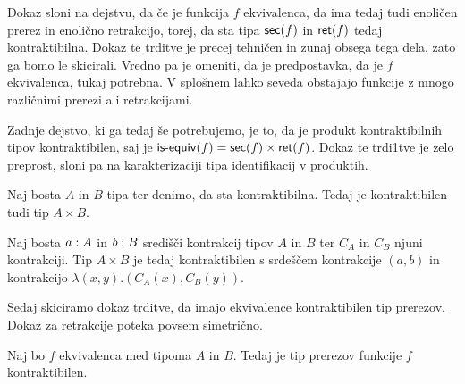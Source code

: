 Dokaz sloni na dejstvu, da če je funkcija \(f\) ekvivalenca, da ima tedaj tudi enoličen prerez in enolično retrakcijo, torej, da sta tipa \(\textnormal{\textsf{sec}}(f)\) in \(\textnormal{\textsf{ret}}(f)\) tedaj kontraktibilna.
Dokaz te trditve je precej tehničen in zunaj obsega tega dela, zato ga bomo le skicirali. Vredno pa je omeniti, da je predpostavka, da je \(f\) ekvivalenca, tukaj potrebna. V splošnem lahko seveda obstajajo funkcije z mnogo različnimi prerezi ali retrakcijami.

Zadnje dejstvo, ki ga tedaj še potrebujemo, je to, da je produkt kontraktibilnih tipov kontraktibilen, saj je \(\textnormal{\textsf{is-equiv}}(f) = \textnormal{\textsf{sec}}(f) \times \textnormal{\textsf{ret}}(f)\). Dokaz te trdi1tve je zelo preprost, sloni pa na karakterizaciji tipa identifikacij v produktih.

\begin{trditev}
  Naj bosta \(A\) in \(B\) tipa ter denimo, da sta kontraktibilna. Tedaj je kontraktibilen tudi tip \(A \times B\).
\end{trditev}

\begin{dokaz}
  Naj bosta \(a : A\) in \(b : B\) središči kontrakcij tipov \(A\) in \(B\) ter \(C_{A}\) in \(C_{B}\) njuni kontrakciji. Tip \(A \times B\) je tedaj kontraktibilen s srdeščem kontrakcije \((a, b)\) in kontrakcijo \(\lambda(x, y).(C_{A}(x), C_{B}(y))\).
\end{dokaz}

Sedaj skiciramo dokaz trditve, da imajo ekvivalence kontraktibilen tip prerezov. Dokaz za retrakcije poteka povsem simetrično.

\begin{trditev}
  \label{contr-sec-of-equiv}
  Naj bo \(f\) ekvivalenca med tipoma \(A\) in \(B\). Tedaj je tip prerezov funkcije \(f\) kontraktibilen.
\end{trditev}

